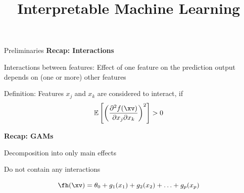 \documentclass[10pt,compress,t,notes=noshow, xcolor=table]{beamer}
\title{Interpretable Machine Learning}
\begin{document}



\begin{framev}[align=top]{Preliminaries}
\textbf{Recap: Interactions}
\begin{itemizeM}
\item Interactions between features: Effect of one feature on the prediction output depends on (one or more) other features
\item Definition: Features $x_j$ and $x_k$ are considered to interact, if
$$
\mathbb{E} \left[ \left( \frac{\partial^2 f(\xv)}{\partial x_j \partial x_k} \right)^2 \right] > 0
$$
\end{itemizeM}
\pause
\textbf{Recap: GAMs}
\begin{itemizeM}
\item Decomposition into only main effects
\item Do not contain any interactions
\end{itemizeM}
$$
\fh (\xv) = \theta_0 + g_1(x_1) + g_2(x_2) + \ldots + g_p(x_p)
$$



\end{framev}
\end{document}
